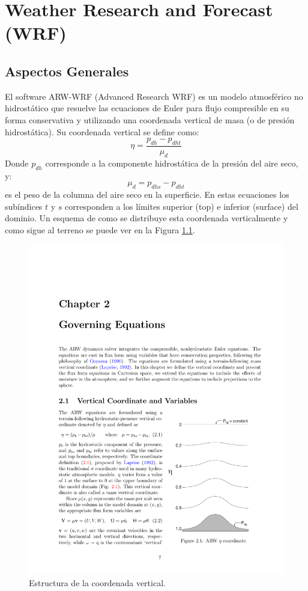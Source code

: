\chapter{Weather Research and Forecast (WRF)}
\section{Aspectos Generales}
El software ARW-WRF (Advanced Research WRF) es un modelo atmosférico no hidrostático que resuelve las ecuaciones de Euler para flujo compresible en su forma conservativa y utilizando una coordenada vertical de masa (o de presión hidrostática). Su coordenada vertical se define como:
\begin{equation}\label{eq:04_eta}
\eta = \frac{p_{dh}-p_{dht}}{\mu_d}
\end{equation}
Donde $p_{dh}$ corresponde a la componente hidrostática de la presión del aire seco, y:
\begin{equation}
\mu_d = p_{dhs} - p_{dht}
\end{equation}
es el peso de la columna del aire seco en la superficie. En estas ecuaciones los subíndices $t$ y $s$ corresponden a los límites superior (top) e inferior (surface) del dominio. Un esquema de como se distribuye esta coordenada verticalmente y como sigue al terreno se puede ver en la Figura \ref{fig:04_eta}.

\begin{figure}[h!]
	\centering
	\includegraphics[width=0.55\linewidth,trim={11.5cm 3.3cm 1cm 14cm},clip]{Imagenes/04/eta}
	\caption{Estructura de la coordenada vertical.}
	\label{fig:04_eta}
\end{figure}

